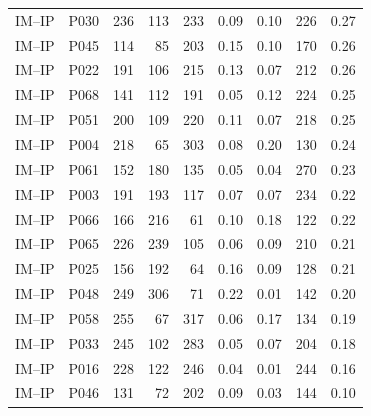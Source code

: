 \documentclass[11pt,a4paper,chapterprefix=false,parskip=false]{scrreprt}
\begin{document}
\begin{appendices}
\begin{longtable}{@{}llrrrrrrr@{}}
        IM--IP & P030 & 236 & 113 & 233 & 0.09         & 0.10         & 226                & 0.27  \\
        IM--IP & P045 & 114 & 85  & 203 & 0.15         & 0.10         & 170                & 0.26  \\
        IM--IP & P022 & 191 & 106 & 215 & 0.13         & 0.07         & 212                & 0.26  \\
        IM--IP & P068 & 141 & 112 & 191 & 0.05         & 0.12         & 224                & 0.25  \\
        IM--IP & P051 & 200 & 109 & 220 & 0.11         & 0.07         & 218                & 0.25  \\
        IM--IP & P004 & 218 & 65  & 303 & 0.08         & 0.20         & 130                & 0.24  \\
        IM--IP & P061 & 152 & 180 & 135 & 0.05         & 0.04         & 270                & 0.23  \\
        IM--IP & P003 & 191 & 193 & 117 & 0.07         & 0.07         & 234                & 0.22  \\
        IM--IP & P066 & 166 & 216 & 61  & 0.10         & 0.18         & 122                & 0.22  \\
        IM--IP & P065 & 226 & 239 & 105 & 0.06         & 0.09         & 210                & 0.21  \\
        IM--IP & P025 & 156 & 192 & 64  & 0.16         & 0.09         & 128                & 0.21  \\
        IM--IP & P048 & 249 & 306 & 71  & 0.22         & 0.01         & 142                & 0.20  \\
        IM--IP & P058 & 255 & 67  & 317 & 0.06         & 0.17         & 134                & 0.19  \\
        IM--IP & P033 & 245 & 102 & 283 & 0.05         & 0.07         & 204                & 0.18  \\
        IM--IP & P016 & 228 & 122 & 246 & 0.04         & 0.01         & 244                & 0.16  \\
        IM--IP & P046 & 131 & 72  & 202 & 0.09         & 0.03         & 144                & 0.10  \\
    \end{longtable}
    \normalsize

\end{appendices}

\newpage


\end{document}
